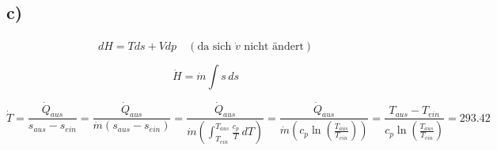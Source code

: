 

\subsection*{c)}

\[
d\hat{H} = Tds + Vdp \quad (\text{da sich } \dot{v} \text{ nicht ändert})
\]

\[
\dot{H} = \dot{m} \int s \, ds
\]

\[
\dot{T} = \frac{\dot{Q}_{aus}}{s_{aus} - s_{ein}} = \frac{\dot{Q}_{aus}}{\dot{m} \left( s_{aus} - s_{ein} \right)} = \frac{\dot{Q}_{aus}}{\dot{m} \left( \int_{T_{ein}}^{T_{aus}} \frac{c_p}{T} \, dT \right)} = \frac{\dot{Q}_{aus}}{\dot{m} \left( c_p \ln \left( \frac{T_{aus}}{T_{ein}} \right) \right)} = \frac{T_{aus} - T_{ein}}{c_p \ln \left( \frac{T_{aus}}{T_{ein}} \right)} = 293.42
\]